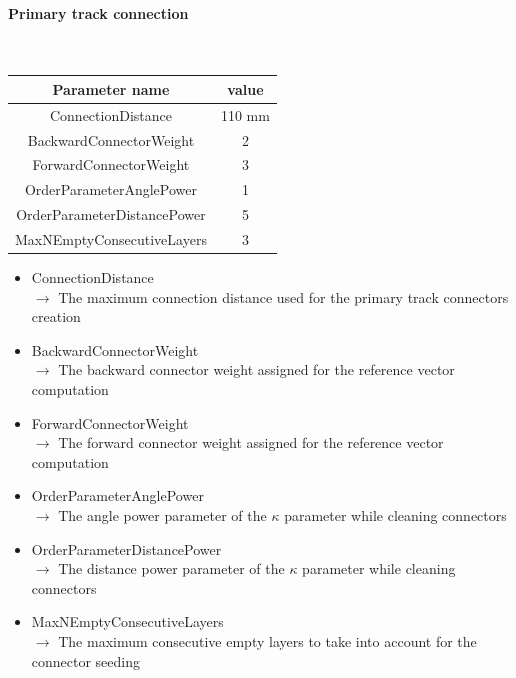 \documentclass[cits]{JINST}
\begin{document}
\newpage
\paragraph{Primary track connection} ~

\begin{table}[!ht]
  \begin{center}
    \begin{tabu} to \linewidth { c | c } 
          Parameter name & value \\
          \hline
          ConnectionDistance & 110 mm \\ 
          BackwardConnectorWeight & 2 \\ 
          ForwardConnectorWeight & 3 \\ 
          OrderParameterAnglePower & 1 \\ 
          OrderParameterDistancePower & 5 \\
          MaxNEmptyConsecutiveLayers & 3 
    \end{tabu} 
  \end{center}
\end{table}

\begin{itemize}
  \item ConnectionDistance \\
  $\rightarrow$ The maximum connection distance used for the primary track connectors creation
  \item BackwardConnectorWeight \\
  $\rightarrow$ The backward connector weight assigned for the reference vector computation
  \item ForwardConnectorWeight \\
  $\rightarrow$ The forward connector weight assigned for the reference vector computation
  \item OrderParameterAnglePower \\ 
  $\rightarrow$ The angle power parameter of the $\kappa$ parameter while cleaning connectors
  \item OrderParameterDistancePower \\
  $\rightarrow$ The distance power parameter of the $\kappa$ parameter while cleaning connectors
  \item MaxNEmptyConsecutiveLayers \\
  $\rightarrow$ The maximum consecutive empty layers to take into account for the connector seeding
\end{itemize}
\end{document}
